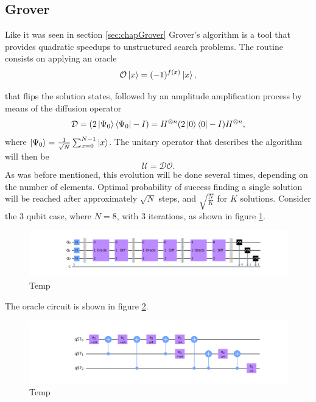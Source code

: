 \documentclass[../../dissertation.tex]{subfiles}
\begin{document}
\subsection{Grover}
Like it was seen in section \ref{sec:chapGrover} Grover's algorithm is a tool that provides quadratic speedups to unstructured search problems. The routine consists on applying an oracle
\begin{equation}
        \mathcal{O}\ket{x} = (-1)^{f(x)}\ket{x},
\end{equation}\par
that flips the solution states, followed by an amplitude amplification process by means of the diffusion operator 
\begin{equation}
        \mathcal{D} = (2\ket{\Psi_0}\bra{\Psi_0} - I) = H^{\otimes n}(2\ket{0}\bra{0} - I)H^{\otimes n},
\end{equation}
where $\ket{\Psi_0}  = \frac{1}{\sqrt{N}}\sum_{x=0}^{N-1} \ket{x}$. The unitary operator that describes the algorithm will then be
\begin{equation}
        \mathcal{U} = \mathcal{D}\mathcal{O}.
\end{equation}
As was before mentioned, this evolution will be done several times, depending on the number of elements. Optimal probability of success finding a single solution will be reached after approximately $\sqrt{N}$ steps, and $\sqrt{\frac{N}{K}}$ for $K$ solutions. Consider the $3$ qubit case, where $N=8$, with $3$ iterations, as shown in figure \ref{fig:groverCircuitQistkit}.
\begin{figure}[!h]
	\centering
	\includegraphics[scale=0.30]{img/Qiskit/GroverQiskit/Circuits/GroverQiskitCirc_N3_M4_S3.png}
	\caption{Temp}
	\label{fig:groverCircuitQistkit}
\end{figure}\par
The oracle circuit is shown in figure \ref{fig:groverOracleCircuitQistkit}. 
\begin{figure}[!h]
	\centering
	\includegraphics[scale=0.30]{img/Qiskit/GroverQiskit/Circuits/GroverQiskitCircOracle_N3_M4_S3.png}
	\caption{Temp}
	\label{fig:groverOracleCircuitQistkit}
\end{figure}\par
\end{document}

